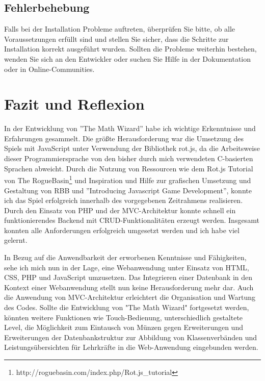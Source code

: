 \documentclass[fontsize:11pt]{article}
\begin{document}
    \subsection{Fehlerbehebung}
        Falls bei der Installation Probleme auftreten, überprüfen Sie bitte, ob alle Voraussetzungen erfüllt sind und stellen Sie sicher, dass die Schritte zur Installation korrekt ausgeführt wurden. Sollten die Probleme weiterhin bestehen, wenden Sie sich an den Entwickler oder suchen Sie Hilfe in der Dokumentation oder in Online-Communities.

\section{Fazit und Reflexion}
    In der Entwicklung von ''The Math Wizard'' habe ich wichtige Erkenntnisse und Erfahrungen gesammelt. Die größte Herausforderung war die Umsetzung des Spiels mit JavaScript unter Verwendung der Bibliothek rot.js, da die Arbeitsweise dieser Programmiersprache von den bisher durch mich verwendeten C-basierten Sprachen abweicht. Durch die Nutzung von Ressourcen wie dem Rot.js Tutorial von The RogueBasin\footnote{http://roguebasin.com/index.php/Rot.js\_tutorial} und Inspiration und Hilfe zur grafischen Umsetzung und Gestaltung von RBB und ''Introducing Javascript Game Development'', konnte ich das Spiel erfolgreich innerhalb des vorgegebenen Zeitrahmens realisieren. Durch den Einsatz von PHP und der MVC-Architektur konnte schnell ein funktionierendes Backend mit CRUD-Funktionalitäten erzeugt werden. Insgesamt konnten alle Anforderungen erfolgreich umgesetzt werden und ich habe viel gelernt. 
    
    In Bezug auf die Anwendbarkeit der erworbenen Kenntnisse und Fähigkeiten, sehe ich mich nun in der Lage, eine Webanwendung unter Einsatz von HTML, CSS, PHP und JavaScript umzusetzen. Das Integrieren einer Datenbank in den Kontext einer Webanwendung stellt nun keine Herausforderung mehr dar. Auch die Anwendung von MVC-Architektur erleichtert die Organisation und Wartung des Codes. Sollte die Entwicklung von "The Math Wizard" fortgesetzt werden, könnten weitere Funktionen wie Touch-Bedienung, unterschiedlich gestaltete Level, die Möglichkeit zum Eintausch von Münzen gegen Erweiterungen und Erweiterungen der Datenbankstruktur zur Abbildung von Klassenverbänden und Leistungsübersichten für Lehrkräfte in die Web-Anwendung eingebunden werden.
\printbibliography
\end{document}
